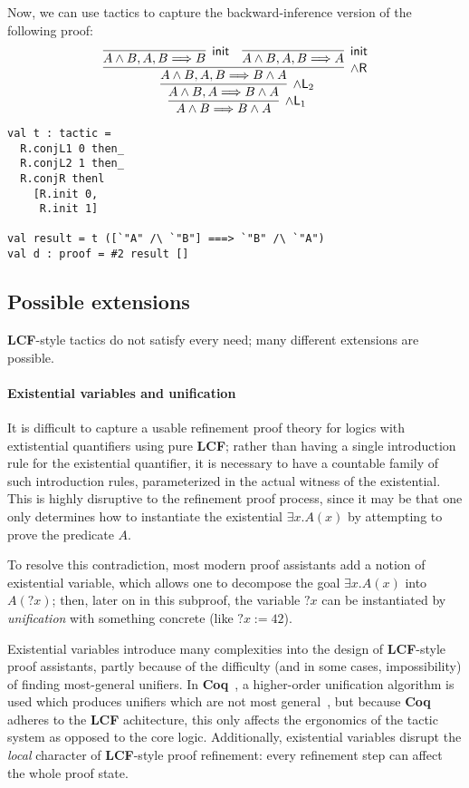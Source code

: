 \documentclass{article}
\newcommand\FormatLang[1]{{\bfseries\sffamily #1}}
\newcommand\LCF{\FormatLang{LCF}}
\newcommand\Coq{\FormatLang{Coq}}
\newcommand\Seq[2]{{#1}\Longrightarrow{#2}}
\newcommand\Right[1]{{#1}\mathsf{R}}
\newcommand\Left[1]{{#1}\mathsf{L}}
\newcommand\RuleInit{\mathsf{init}}
\theoremstyle{definition}
\theoremstyle{remark}
\begin{document}
Now, we can use tactics to capture the backward-inference version of
the following proof:
\[
  \infer[\Left{\land}_1]{
    \Seq{A\land B}{B\land A}
  }{
    \infer[\Left{\land}_2]{
      \Seq{A\land B,A}{B\land A}
    }{
      \infer[\Right{\land}]{
        \Seq{A\land B,A,B}{B\land A}
      }{
        \infer[\RuleInit]{
          \Seq{A\land B,A,B}{B}
        }{
        }
        &
        \infer[\RuleInit]{
          \Seq{A\land B,A,B}{A}
        }{
        }
      }
    }
  }
\]

\begin{verbatim}
val t : tactic =
  R.conjL1 0 then_
  R.conjL2 1 then_
  R.conjR thenl
    [R.init 0,
     R.init 1]

val result = t ([`"A" /\ `"B"] ===> `"B" /\ `"A")
val d : proof = #2 result []
\end{verbatim}


\subsection{Possible extensions}

\LCF{}-style tactics do not satisfy every need; many different
extensions are possible.

\paragraph{Existential variables and unification}

It is difficult to capture a usable refinement proof theory for logics
with extistential quantifiers using pure \LCF{}; rather than having a
single introduction rule for the existential quantifier, it is
necessary to have a countable family of such introduction rules,
parameterized in the actual witness of the existential. This is highly
disruptive to the refinement proof process, since it may be that one
only determines how to instantiate the existential $\exists x.A(x)$ by
attempting to prove the predicate $A$.

To resolve this contradiction, most modern proof assistants add a
notion of existential variable, which allows one to decompose the goal
$\exists x.A(x)$ into $A(?x)$; then, later on in this subproof, the
variable $?x$ can be instantiated by \emph{unification} with something
concrete (like $?x:= 42$).

Existential variables introduce many complexities into the design of
\LCF{}-style proof assistants, partly because of the difficulty (and
in some cases, impossibility) of finding most-general unifiers. In
\Coq{}~\cite{coq:reference-manual}, a higher-order unification
algorithm is used which produces unifiers which are not most
general~\cite{ziliani:2015}, but because \Coq{} adheres to the \LCF{}
achitecture, this only affects the ergonomics of the tactic system as
opposed to the core logic. Additionally, existential variables disrupt
the \emph{local} character of \LCF{}-style proof refinement: every
refinement step can affect the whole proof state.
\end{document}
